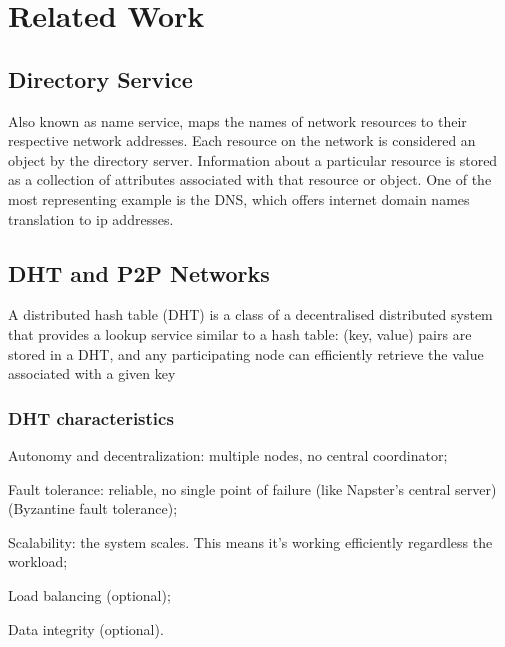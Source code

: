 \chapter{Related Work}
\label{chapter:related_work}

\section{Directory Service}
Also known as name service, maps the names of network resources to their respective network addresses. Each resource on the network is considered an object by the directory server. Information about a particular resource is stored as a collection of attributes associated with that resource or object. One of the most representing example is the DNS, which offers internet domain names translation to ip addresses.

\section{DHT and P2P Networks}
A distributed hash table (DHT) is a class of a decentralised distributed system that provides a lookup service similar to a hash table: (key, value) pairs are stored in a DHT, and any participating node can efficiently retrieve the value associated with a given key

\subsection{DHT characteristics}
\begin{list}{}{}
\item {Autonomy and decentralization}: multiple nodes, no central coordinator;
\item {Fault tolerance}: reliable, no single point of failure (like Napster’s central server) (Byzantine fault tolerance);
\item {Scalability}: the system scales. This means it’s working efficiently regardless the workload;
\item {Load balancing} (optional);
\item {Data integrity} (optional).
\end{list}

